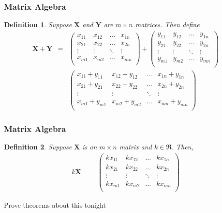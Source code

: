 \documentclass{beamer}
\newtheorem{defn}{Definition}
\numberwithin{equation}{section}
\begin{document}
\begin{frame}
\frametitle{Matrix Algebra}
\begin{defn} Suppose $\boldsymbol{X}$ and $\boldsymbol{Y} $ are $m \times n$ matrices.  Then define 
\begin{eqnarray} 
\boldsymbol{X} + \boldsymbol{Y} & = & \begin{pmatrix} 
x_{11} & x_{12} & \hdots & x_{1n} \\
x_{21} & x_{22} & \hdots & x_{2n} \\
\vdots & \vdots & \ddots & \vdots \\
x_{m1} & x_{m2} & \hdots & x_{mn} \\
\end{pmatrix} + 
\begin{pmatrix} 
y_{11} & y_{12} & \hdots & y_{1n} \\
y_{21} & y_{22} & \hdots & y_{2n} \\
\vdots & \vdots & \ddots & \vdots \\
y_{m1} & y_{m2} & \hdots & y_{mn} \\
\end{pmatrix}
\nonumber \\
& = & \begin{pmatrix} 
x_{11} + y_{11} & x_{12} + y_{12} & \hdots & x_{1n} + y_{1n} \\
x_{21} + y_{21} & x_{22} + y_{22} & \hdots & x_{2n} + y_{2n} \\
\vdots & \vdots & \ddots & \vdots\\
x_{m1} + y_{m1} & x_{m2} + y_{m2} & \hdots & x_{mn} + y_{mn} \\
\end{pmatrix} 
\nonumber 
\end{eqnarray}

\end{defn}

\end{frame}

\begin{frame}
\frametitle{Matrix Algebra} 
\begin{defn}
Suppose $\boldsymbol{X}$ is an $m \times n$ matrix and $k \in \Re$.  Then, 
\begin{eqnarray}
k \boldsymbol{X} & =&  \begin{pmatrix} 
k x_{11} & k x_{12} & \hdots &  k x_{1n} \\
k x_{21} & k x_{22} & \hdots & k x_{2n} \\
\vdots & \vdots & \ddots & \vdots \\
k x_{m1} & k x_{m2} & \hdots & k x_{mn} \\
\end{pmatrix}
\nonumber 
\end{eqnarray}

\end{defn}

\alert{Prove theorems about this tonight}
\end{frame}
\end{document}

